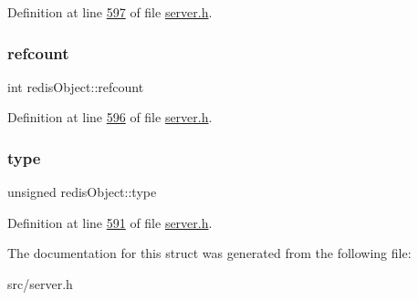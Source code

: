 Definition at line \hyperlink{server_8h_source_l00597}{597} of file \hyperlink{server_8h_source}{server.\+h}.

\mbox{\label{structredisObject_ae9b12c2f70ff2319cb6c7bbc94e7a697}} 
\subsubsection{\texorpdfstring{refcount}{refcount}}
{\footnotesize\ttfamily int redis\+Object\+::refcount}



Definition at line \hyperlink{server_8h_source_l00596}{596} of file \hyperlink{server_8h_source}{server.\+h}.

\mbox{\label{structredisObject_a36beebc5584570a6614f8b49047ed5e5}} 
\subsubsection{\texorpdfstring{type}{type}}
{\footnotesize\ttfamily unsigned redis\+Object\+::type}



Definition at line \hyperlink{server_8h_source_l00591}{591} of file \hyperlink{server_8h_source}{server.\+h}.



The documentation for this struct was generated from the following file\+:\begin{DoxyCompactItemize}
\item 
src/server.\+h\end{DoxyCompactItemize}
